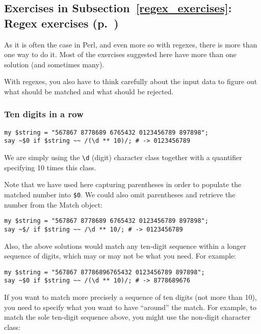 \subsection{Exercises in Subsection~\ref{regex_exercises}: Regex exercises (p.~\pageref{regex_exercises})}
\label{sol_regex_exercises}

As it is often the case in Perl, and even more so with 
regexes, there is more than one way to do it. Most of the exercises suggested here have more than one solution (and 
sometimes many).

With regexes, you also have to think carefully about the 
input data to figure out what should be matched and what 
should be rejected.

\subsubsection{Ten digits in a row}

\begin{verbatim}
my $string = "567867 8778689 6765432 0123456789 897898";
say ~$0 if $string ~~ /(\d ** 10)/; # -> 0123456789
\end{verbatim}

We are simply using the \verb'\d' (digit) character class 
together with a quantifier specifying 10 times this class.

Note that we have used here capturing parentheses in order 
to populate the matched number into \verb'$0'. We could also 
omit parentheses and retrieve the number from the Match object:

\begin{verbatim}
my $string = "567867 8778689 6765432 0123456789 897898";
say ~$/ if $string ~~ /\d ** 10/; # -> 0123456789
\end{verbatim}
%

Also, the above solutions would match any ten-digit sequence 
within a longer sequence of digits, which may or may not 
be what you need. For example:

\begin{verbatim}
my $string = "567867 87786896765432 0123456789 897898";
say ~$0 if $string ~~ /(\d ** 10)/; # -> 8778689676
\end{verbatim}

If you want to match more precisely a sequence of ten 
digits (not more than 10), you need to specify what you 
want to have ``around'' the match. For example, to 
match the sole ten-digit sequence above, you might use 
the non-digit character class:

